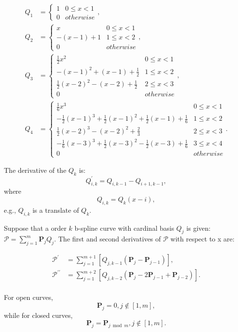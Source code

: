 \documentclass[11pt]{article}
\newcommand{\bmmp}{\bm{\mathcal{P}}} %
\begin{document}
\[
\begin{split}
Q_1 &= 
\begin{cases}
1 & 0 \leq x < 1\\
0 & otherwise
\end{cases}, \\
Q_2 &= 
\begin{cases}
x & 0 \leq x < 1 \\
-(x-1)+1 & 1 \leq x < 2\\
0 & otherwise
\end{cases}, \\
Q_3 &= 
\begin{cases}
\frac{1}{2}x^2 & 0 \leq x < 1 \\
-(x-1)^2+(x-1)+\frac{1}{2} & 1 \leq x < 2\\
\frac{1}{2}(x-2)^2-(x-2)+\frac{1}{2} & 2 \leq x < 3\\
0 & otherwise
\end{cases}, \\
Q_4 &= 
\begin{cases}
\frac{1}{6}x^3 & 0 \leq x < 1 \\
-\frac{1}{2}(x-1)^3+\frac{1}{2}(x-1)^2+\frac{1}{2}(x-1)+\frac{1}{6} & 1 \leq x < 2\\
\frac{1}{2}(x-2)^3-(x-2)^2+\frac{2}{3} & 2 \leq x < 3\\
-\frac{1}{6}(x-3)^3+\frac{1}{2}(x-3)^2-\frac{1}{2}(x-3)+\frac{1}{6} & 3 \leq x < 4\\
0 & otherwise
\end{cases}.
\end{split}
\]

The derivative of the $Q_k$ is: 
\[
Q_{i,k}^{\prime} = Q_{i,k-1}-Q_{i+1,k-1},
\]
where
\[
Q_{i,k} = Q_k(x-i),
\]
e.g., $Q_{i,k}$ is a translate of $Q_k$.

Suppose that a order $k$ b-spline curve with cardinal basis $Q_j$ is given: $\bmmp=\sum_{j=1}^m\bm{P}_jQ_j$. The first and second derivatives of $\bmmp$ with respect to x are:

\[
\begin{split}
\bmmp^{\prime} &= \sum_{j=1}^{m+1}[Q_{j,k-1}(\bm{P}_j-\bm{P}_{j-1})], \\
\bmmp^{\prime\prime} &= \sum_{j=1}^{m+2}[Q_{j,k-2}(\bm{P}_j-2\bm{P}_{j-1}+\bm{P}_{j-2})]. \\
\end{split}
\]

For open curves, 
\[
\bm{P}_j=0, j \notin [1,m],
\]
while for closed curves, 
\[
\bm{P}_j = \bm{P}_{j \bmod m}, j \notin [1,m].
\]
\end{document}
